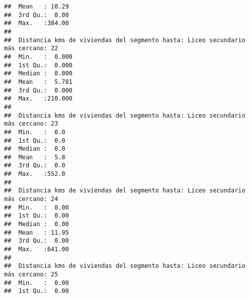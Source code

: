 \documentclass[11pt,]{article}
\begin{document}
\begin{verbatim}
##  Mean   : 10.29                                                                 
##  3rd Qu.:  0.00                                                                 
##  Max.   :384.00                                                                 
##                                                                                 
##  Distancia kms de viviendas del segmento hasta: Liceo secundario más cercano: 22
##  Min.   :  0.000                                                                
##  1st Qu.:  0.000                                                                
##  Median :  0.000                                                                
##  Mean   :  5.781                                                                
##  3rd Qu.:  0.000                                                                
##  Max.   :210.000                                                                
##                                                                                 
##  Distancia kms de viviendas del segmento hasta: Liceo secundario más cercano: 23
##  Min.   :  0.0                                                                  
##  1st Qu.:  0.0                                                                  
##  Median :  0.0                                                                  
##  Mean   :  5.8                                                                  
##  3rd Qu.:  0.0                                                                  
##  Max.   :552.0                                                                  
##                                                                                 
##  Distancia kms de viviendas del segmento hasta: Liceo secundario más cercano: 24
##  Min.   :  0.00                                                                 
##  1st Qu.:  0.00                                                                 
##  Median :  0.00                                                                 
##  Mean   : 11.95                                                                 
##  3rd Qu.:  0.00                                                                 
##  Max.   :641.00                                                                 
##                                                                                 
##  Distancia kms de viviendas del segmento hasta: Liceo secundario más cercano: 25
##  Min.   :  0.00                                                                 
##  1st Qu.:  0.00                                                                 

\end{verbatim}
\end{document}

